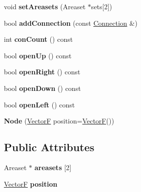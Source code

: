 \begin{DoxyCompactItemize}
\item 
\hypertarget{classNode_a6450dca659f85cd33edbb8910811c9a1}{void {\bfseries set\+Areasets} (Areaset $\ast$sets\mbox{[}2\mbox{]})}\label{classNode_a6450dca659f85cd33edbb8910811c9a1}

\item 
\hypertarget{classNode_a1adae23476112f3cfa2a29e0c43759d3}{bool {\bfseries add\+Connection} (const \hyperlink{structConnection}{Connection} \&)}\label{classNode_a1adae23476112f3cfa2a29e0c43759d3}

\item 
\hypertarget{classNode_adb1a2bb6cbbb29ebecfe7a2ec59955c7}{int {\bfseries con\+Count} () const }\label{classNode_adb1a2bb6cbbb29ebecfe7a2ec59955c7}

\item 
\hypertarget{classNode_aa8e730f4312f3e07855fcad130efd9d9}{bool {\bfseries open\+Up} () const }\label{classNode_aa8e730f4312f3e07855fcad130efd9d9}

\item 
\hypertarget{classNode_a29cd0712d13c59420d4c66269a64c5f1}{bool {\bfseries open\+Right} () const }\label{classNode_a29cd0712d13c59420d4c66269a64c5f1}

\item 
\hypertarget{classNode_a39a07081bb9473f5b7e6f95519e3a6b2}{bool {\bfseries open\+Down} () const }\label{classNode_a39a07081bb9473f5b7e6f95519e3a6b2}

\item 
\hypertarget{classNode_a76dc3334942fd5dd30c650018b4e7d4e}{bool {\bfseries open\+Left} () const }\label{classNode_a76dc3334942fd5dd30c650018b4e7d4e}

\item 
\hypertarget{classNode_a89989d52fa93844ca1be5f0c4f96ae8f}{{\bfseries Node} (\hyperlink{structVectorF}{Vector\+F} position=\hyperlink{structVectorF}{Vector\+F}())}\label{classNode_a89989d52fa93844ca1be5f0c4f96ae8f}

\end{DoxyCompactItemize}
\subsection*{Public Attributes}
\begin{DoxyCompactItemize}
\item 
\hypertarget{classNode_a7771548b1788566ae2af70da09edd3e0}{Areaset $\ast$ {\bfseries areasets} \mbox{[}2\mbox{]}}\label{classNode_a7771548b1788566ae2af70da09edd3e0}

\item 
\hypertarget{classNode_a47b5558f6416791a4789051c64411c3e}{\hyperlink{structVectorF}{Vector\+F} {\bfseries position}}\label{classNode_a47b5558f6416791a4789051c64411c3e}

\end{DoxyCompactItemize}
